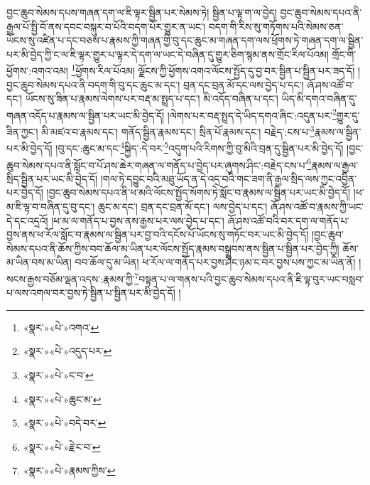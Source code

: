 བྱང་ཆུབ་སེམས་དཔས་གཞན་དག་ལ་ཇི་ལྟར་སྦྱིན་པར་སེམས་ཏེ། སྦྱིན་པ་ལྟ་ག་ལ་བྱེད། བྱང་ཆུབ་སེམས་དཔའ་ནི་རྒྱལ་པོ་སྤྱི་བོ་ནས་དབང་བསྐུར་བ་པོའི་བདག་པོར་གྱུར་ན་ཡང་། བདག་གི་རིས་སུ་གཏོགས་པའི་སེམས་ཅན་ཡོངས་སུ་འཛིན་པ་དང་བཅས་པ་རྣམས་ཀྱི་གཞན་གྱི་བུ་དང་ཆུང་མ་གཞན་དག་ལས་ཕྲོགས་ཏེ་གཞན་དག་ལ་སྦྱིན་པར་མི་བྱེད་ཀྱི་ང་ལ་ཇི་ལྟར་གྱུར་པ་ལྟར་དེ་དག་ལ་ཡང་དེ་བཞིན་དུ་གྱུར་ཅིག་སྙམ་ནས་གྲོང་རིལ་པོའམ། གྲོང་གི་ཕྱོགས་:འགའ་འམ། \footnote{«སྣར་»«པེ་»འགའ་}ཕྱོགས་རིལ་པོའམ། ལྗོངས་ཀྱི་ཕྱོགས་འགའ་ལོངས་སྤྱོད་དུ་བྱ་བར་སྦྱིན་པ་སྦྱིན་པར་ཟད་དོ། །བྱང་ཆུབ་སེམས་དཔའ་ནི་བདག་གི་བུ་དང་ཆུང་མ་དང་། བྲན་དང་བྲན་མོ་དང་ལས་བྱེད་པ་དང་། ཞོ་ཤས་འཚོ་བ་དང་། ཡོངས་སུ་ཟིན་པ་རྣམས་ལེགས་པར་བརྡ་མ་སྤྲད་པ་དང་། མི་འདོད་བཞིན་པ་དང་། ཡིད་མི་དགའ་བཞིན་དུ་གཞན་འདོད་པ་རྣམས་ལ་སྦྱིན་པར་ཡང་མི་བྱེད་དོ། །ལེགས་པར་བརྡ་སྤྲད་དེ་ཡིད་དགའ་ཞིང་:འདུན་པར་\footnote{«སྣར་»«པེ་»འདུད་པར་}གྱུར་དུ་ཟིན་ཀྱང་། མི་མཛའ་བ་རྣམས་དང་། གནོད་སྦྱིན་རྣམས་དང་། སྲིན་པོ་རྣམས་དང་། བརྗེད་:ངས་པ་\footnote{«སྣར་»«པེ་»ང་བ་}རྣམས་ལ་སྦྱིན་པར་མི་བྱེད་དོ། །བུ་དང་:ཆུང་མ་དང་\footnote{«སྣར་»«པེ་»ཆུང་མ་}སྐྱིད་:དེ་བར་\footnote{«སྣར་»«པེ་»བདེ་བར་}འདུག་པའི་རིགས་ཀྱི་བུ་མིའི་བྲན་དུ་སྦྱིན་པར་མི་བྱེད་དོ། །བྱང་ཆུབ་སེམས་དཔའ་ནི་སློང་བ་པོ་ཤས་ཆེར་གཞན་ལ་གནོད་པ་བྱེད་པར་ཞུགས་ཤིང་:བརྗེད་ངས་པ་\footnote{«སྣར་»«པེ་»རྗེ་ང་བ་}རྣམས་ལ་རྒྱལ་སྲིད་སྦྱིན་པར་ཡང་མི་བྱེད་དོ། །གལ་ཏེ་དབྱུང་བའི་མཐུ་ཡོད་ན་དེ་འདྲ་བའི་གང་ཟག་ནི་རྒྱལ་སྲིད་ལས་ཀྱང་འབྱིན་པར་བྱེད་དོ། །བྱང་ཆུབ་སེམས་དཔའ་ནི་ཕ་མའི་ལོངས་སྤྱོད་སོགས་ཏེ་སློང་བ་རྣམས་ལ་སྦྱིན་པར་ཡང་མི་བྱེད་དོ། །ཕ་མ་ཇི་ལྟ་བ་བཞིན་དུ་བུ་དང་། ཆུང་མ་དང་། བྲན་དང་བྲན་མོ་དང་། ལས་བྱེད་པ་དང་། ཞོ་ཤས་འཚོ་བ་རྣམས་ཀྱི་ཡང་དེ་དང་འདྲའོ། །ཕ་མ་ལ་གནོད་པ་བྱས་ནས་རྒྱས་པར་ལས་བྱེད་པ་དང་། ཞོ་ཤས་འཚོ་བའི་བར་དག་ལ་གནོད་པ་བྱས་ནས་ཕ་རོལ་སློང་བ་རྣམས་ལ་སྦྱིན་པར་བྱ་བའི་དངོས་པོ་ཡོངས་སུ་གཏོང་བར་ཡང་མི་བྱེད་དོ། །བྱང་ཆུབ་སེམས་དཔའ་ནི་ཆོས་ཀྱིས་བབ་ཆོལ་མ་ཡིན་པར་ལོངས་སྤྱོད་རྣམས་བསྒྲུབས་ནས་སྦྱིན་པ་སྦྱིན་པར་བྱེད་ཀྱི། ཆོས་མ་ཡིན་བས་མ་ཡིན། བབ་ཆོལ་དུ་མ་ཡིན། ཕ་རོལ་ལ་གནོད་པར་བྱས་ཤིང་ཉམ་ང་བར་བྱས་པས་ཀྱང་མ་ཡིན་ནོ། །སངས་རྒྱས་བཅོམ་ལྡན་འདས་:རྣམས་ཀྱི་\footnote{«སྣར་»«པེ་»རྣམས་ཀྱིས་}བསྟན་པ་ལ་གནས་པའི་བྱང་ཆུབ་སེམས་དཔའ་ནི་ཇི་ལྟ་བུར་ཡང་བསླབ་པ་ལས་འགལ་བར་བྱས་ཏེ་སྦྱིན་པ་སྦྱིན་པར་མི་བྱེད་དོ། །

